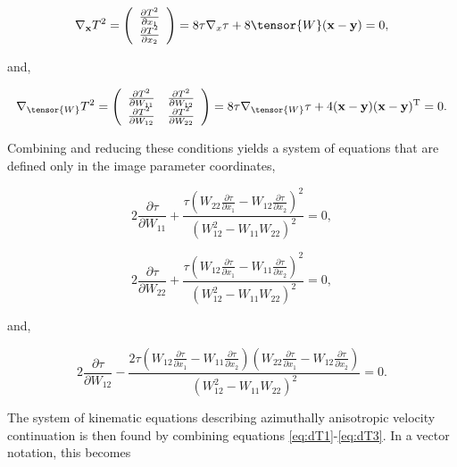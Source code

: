 \begin{equation}
\label{eq:dTdx}
\nabla _{\mathbf{x}}T^2
=\left(
\begin{array}{c}
 \frac{\partial T^2 }{\partial x_1} \\
 \frac{\partial T^2 }{\partial x_2}
\end{array}
\right)=8\tau \nabla _x\tau +8\tensor{W}(\mathbf{x}-\mathbf{y})=0, 
\end{equation}

\noindent and,

\begin{equation}
\label{eq:dTdW}
\nabla _{\tensor{W}}T^2 
=
\left(
\begin{array}{cc}
 \frac{\partial T^2}{\partial W_{11}} &  \frac{\partial T^2}{\partial W_{12}} \\
 \frac{\partial T^2}{\partial W_{12}} &  \frac{\partial T^2}{\partial W_{22}}
\end{array}
\right)
=8\tau \nabla _{\tensor{W}}\tau +4(\mathbf{x}-\mathbf{y})(\mathbf{x}-\mathbf{y})^{\mathrm{T}}=0.
\end{equation}

\noindent Combining and reducing these conditions yields a system of equations that are defined only in the image parameter coordinates,

\begin{equation}
\label{eq:dT1}
2 \frac{\partial \tau }{\partial W_{11}}+\frac{\tau \left(W_{22} \frac{\partial \tau }{\partial x_1}-W_{12} \frac{\partial \tau }{\partial x_2}\right)^2}{\left(W_{12}^2-W_{11}W_{22}\right)^2}=0,
\end{equation}

\begin{equation}
\label{eq:dT2}
2 \frac{\partial \tau }{\partial W_{22}}+\frac{\tau\left(W_{12} \frac{\partial \tau }{\partial x_1}-W_{11} \frac{\partial \tau }{\partial x_2}\right)^2}{\left(W_{12}^2-W_{11}W_{22}\right)^2}=0,
\end{equation}

\noindent and,

\begin{equation}
\label{eq:dT3}
2 \frac{\partial \tau }{\partial W_{12}}-\frac{2\tau \left(W_{12}\frac{\partial \tau }{\partial x_1}-W_{11}\frac{\partial \tau }{\partial x_2}\right)\left(W_{22} \frac{\partial \tau }{\partial x_1}-W_{12} \frac{\partial \tau }{\partial x_2}\right)}{\left(W_{12}^2-W_{11}W_{22}\right)^2}=0.
\end{equation}

\noindent The system of kinematic equations describing azimuthally ani\-sotropic velocity continuation is then found by combining equations \ref{eq:dT1}-\ref{eq:dT3}. 
In a vector notation, this becomes


